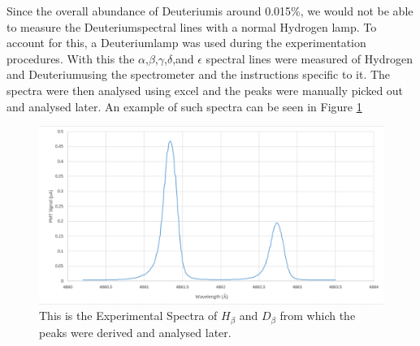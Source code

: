 \documentclass[%
 aps,%
 pra,%
 preprint, %
 amsmath, %
 amsfonts, %
 amssymb, %
]{revtex4-2}
\newcommand{\D}{Deuterium}
\begin{document}
Since the overall abundance of \D   is around 0.015\%, we would not be able to measure the \D   spectral lines with a normal Hydrogen lamp. To account for this, a \D   lamp was used during the experimentation procedures. With this the $\alpha$,$\beta$,$\gamma$,$\delta$,and $\epsilon$ spectral lines were measured of Hydrogen and \D   using the spectrometer and the instructions specific to it. The spectra were then analysed using excel and the peaks were manually picked out and analysed later. An example of such spectra can be seen in Figure \ref{fig:Spectrum}

\begin{figure}[h!]
  \includegraphics[width=\linewidth]{Figures/Spectral.PNG}
  \caption{This is the Experimental Spectra of $H_{\beta}$ and $D_{\beta}$ from which the peaks were derived and analysed later.}
  \label{fig:Spectrum}
\end{figure}
\newpage
\end{document}
